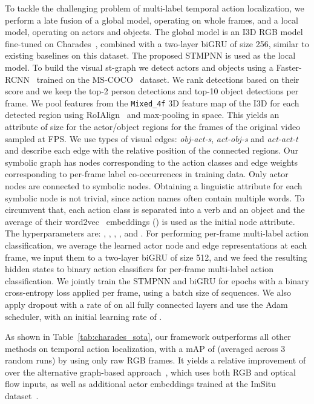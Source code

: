 \documentclass[runningheads]{llncs}
\begin{document}
To tackle the challenging problem of multi-label temporal action localization, we perform a late fusion of a global model, operating on whole frames, and a local model, operating on actors and objects. The global model is an I3D RGB model~\cite{Carreira:CVPR17} fine-tuned on Charades~\cite{Piergiovanni:CVPR18}, combined with a two-layer biGRU of size 256, similar to existing baselines on this dataset. The proposed \ac{STMPNN} is used as the local model.
To build the visual st-graph we detect actors and objects using a Faster-RCNN~\cite{He:TPAMI18} trained on the MS-COCO~\cite{Lin:ECCV14} dataset. We rank detections based on their score and we keep the top-2 person detections and top-10 object detections per frame. 
We pool features from the \texttt{Mixed\_4f} 3D feature map of the I3D for each detected region using RoIAlign~\cite{He:TPAMI18} and max-pooling in space. This yields an attribute of size  for the actor/object regions for the frames of the original video sampled at  FPS.
We use  types of visual edges: \emph{obj-act-s}, \emph{act-obj-s} and \emph{act-act-t} and describe each edge with the relative position of the connected regions. Our symbolic graph has nodes corresponding to the  action classes and edge weights corresponding to per-frame label co-occurrences in training data. Only actor nodes are connected to symbolic nodes. Obtaining a linguistic attribute for each symbolic node is not trivial, since action names often contain multiple words. To circumvent that, each action class is separated into a verb and an object and the average of their word2vec~\cite{Mikolov:NIPS13} embeddings () is used as the initial node attribute. 
The hyperparameters are:  , , , ,  and . For performing per-frame multi-label action classification, we average the learned actor node and edge representations at each frame, we input them to a two-layer biGRU of size 512, and we feed the resulting hidden states to binary action classifiers for per-frame multi-label action classification. We jointly train the \ac{STMPNN} and biGRU for  epochs with a binary cross-entropy loss applied per frame, using a batch size of  sequences. We also apply dropout with a rate of  on all fully connected layers and use the Adam scheduler, with an initial learning rate of .

As shown in Table~\ref{tab:charades_sota},
our framework outperforms all other methods on temporal action localization, with a mAP of  (averaged across 3 random runs) by using only raw RGB frames. It yields a relative improvement of  over the alternative graph-based approach~\cite{Ghosh:WACV20}, which uses both RGB and optical flow inputs, as well as additional actor embeddings trained at the ImSitu dataset~\cite{Yatskar:CVPR16}.
\end{document}
